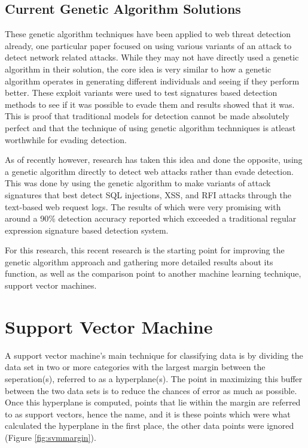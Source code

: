 \subsection{Current Genetic Algorithm Solutions}

These genetic algorithm techniques have been applied to web threat detection already, one particular paper focused on using various variants of an attack to detect network related attacks.  While they may not have directly used a genetic algorithm in their solution, the core idea is very similar to how a genetic algorithm operates in generating different individuals and seeing if they perform better.  These exploit variants were used to test signatures based detection methods to see if it was possible to evade them and results showed that it was.  This is proof that traditional models for detection cannot be made absolutely perfect and that the technique of using genetic algorithm technniques is atleast worthwhile for evading detection. %

As of recently however, research has taken this idea and done the opposite, using a genetic algorithm directly to detect web attacks rather than evade detection.  This was done by using the genetic algorithm to make variants of attack signatures that best detect SQL injections, XSS, and RFI attacks through the text-based web request logs.  The results of which were very promising with around a 90\% detection accuracy reported which exceeded a traditional regular expression signature based detection system. %

For this research, this recent research is the starting point for improving the genetic algorithm approach and gathering more detailed results about its function, as well as the comparison point to another machine learning technique, support vector machines.

\section{Support Vector Machine}

A support vector machine's main technique for classifying data is by dividing the data set in two or more categories with the largest margin between the seperation(s), referred to as a hyperplane(s).  The point in maximizing this buffer between the two data sets is to reduce the chances of error as much as possible.  Once this hyperplane is computed, points that lie within the margin are referred to as support vectors, hence the name, and it is these points which were what calculated the hyperplane in the first place, the other data points were ignored (Figure \ref{fig:svmmargin}).  

